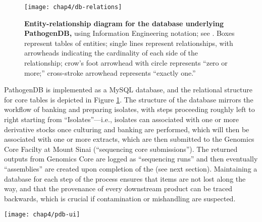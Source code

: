 \begin{figure}[htb]
  \texttt{[image: chap4/db-relations]}               
  \caption[Entity-relationship diagram for the database underlying PathogenDB]{\textbf{Entity-relationship diagram for the database underlying PathogenDB,} using Information Engineering notation; see \textcite{Halpin2010}. Boxes represent tables of entities; single lines represent relationships, with arrowheads indicating the cardinality of each side of the relationship; crow’s foot arrowhead with circle represents “zero or more;” cross-stroke arrowhead represents “exactly one.”}
  \label{fig:pdb_relations}
\end{figure}

PathogenDB is implemented as a MySQL database, and the relational structure for core tables is depicted in Figure \ref{fig:pdb_relations}. The structure of the database mirrors the workflow of banking and preparing isolates, with steps proceeding roughly left to right starting from ``Isolates''—i.e., isolates can associated with one or more derivative stocks once culturing and banking are performed, which will then be associated with one or more extracts, which are then submitted to the Genomics Core Facilty at Mount Sinai (``sequencing core submissions''). The returned outputs from Genomics Core are logged as ``sequencing runs'' and then eventually ``assemblies'' are created upon completion of the \pathogendbpipeline{} (see next section). Maintaining a database for each step of the process ensures that items are not lost along the way, and that the provenance of every downstream product can be traced backwards, which is crucial if contamination or mishandling are suspected.

\begin{sidewaysfigure}[hp]
  \sidewaysvspace
  \centering
  \texttt{[image: chap4/pdb-ui]}               
\end{sidewaysfigure}

